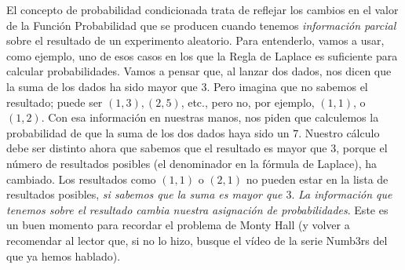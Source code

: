 El concepto de probabilidad condicionada trata de reflejar los cambios en el
valor de la Función Probabilidad que se producen cuando tenemos {\em
información parcial} sobre el resultado de un experimento aleatorio. Para
entenderlo, vamos a usar, como ejemplo, uno de esos casos en los que la Regla
de Laplace es suficiente para calcular probabilidades. Vamos a pensar que, al
lanzar dos dados, nos dicen que la suma de los dados ha sido mayor que 3.
Pero imagina que no sabemos el resultado; puede ser $(1,3), (2,5)$, etc.,
pero no, por ejemplo, $(1,1)$, o $(1,2)$. Con esa información en nuestras
manos, nos piden que calculemos la probabilidad de que la suma de los dos
dados haya sido un $7$. Nuestro cálculo debe ser distinto ahora que sabemos
que el resultado es mayor que 3, porque el número de resultados posibles (el
denominador en la fórmula de Laplace), ha cambiado. Los resultados como
$(1,1)$ o $(2,1)$ no pueden estar en la lista de resultados posibles, {\em si
sabemos que la suma es mayor que $3$}.  {\sf\em La información que tenemos
sobre el resultado cambia nuestra asignación de probabilidades}. Este es un
buen momento para recordar el problema de Monty Hall (y volver a recomendar
al lector que, si no lo hizo, busque el vídeo de la serie Numb3rs del que ya
hemos hablado).

